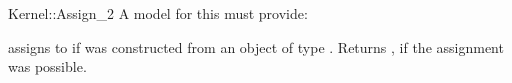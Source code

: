 \begin{ccRefFunctionObjectConcept}{Kernel::Assign_2}
A model for this must provide:


{assigns  to  if 
was constructed from an object of type .
Returns , if the assignment was possible.}

\ccSeeAlso
{}

\end{ccRefFunctionObjectConcept}
